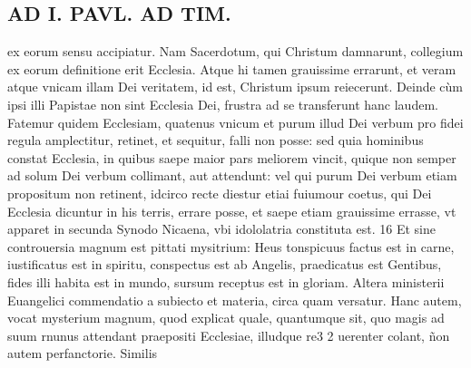 \documentclass{article}
\begin{document}
\begin{pages}
\section*{AD I. PAVL. AD TIM. }
\marginpar{[ p.174 ]}\pstart ex eorum sensu accipiatur. Nam Sacerdotum, qui Christum damnarunt, collegium ex eorum definitione erit Ecclesia. Atque hi tamen grauissime errarunt, et veram atque vnicam illam Dei veritatem, id est, Christum ipsum reiecerunt. Deinde cùm ipsi illi Papistae non sint Ecclesia Dei, frustra ad se transferunt hanc laudem. Fatemur quidem Ecclesiam, quatenus vnicum et purum illud Dei verbum pro fidei regula amplectitur, retinet, et sequitur, falli non posse: sed quia hominibus constat Ecclesia, in quibus saepe maior pars meliorem vincit, quique non semper ad solum Dei verbum collimant, aut attendunt: vel qui purum Dei verbum etiam propositum non retinent, idcirco recte diestur etiai fuiumour coetus, qui Dei Ecclesia dicuntur in his terris, errare posse, et saepe etiam grauissime errasse, vt apparet in secunda Synodo Nicaena, vbi idololatria constituta est. 16 Et sine controuersia magnum est pittati mysitrium: Heus tonspicuus factus est in carne, iustificatus est in spiritu, conspectus est ab Angelis, praedicatus est Gentibus, fides illi habita est in mundo, sursum receptus est in gloriam. Altera ministerii Euangelici commendatio a subiecto et materia, circa quam versatur. Hanc autem, vocat mysterium magnum, quod explicat quale, quantumque sit, quo magis ad suum rnunus attendant praepositi Ecclesiae, illudque re3 2 uerenter colant, ñon autem perfanctorie. Similis  \pend
{}
{}
\subsection*{\textit{}}

\end{pages}
\end{document}
